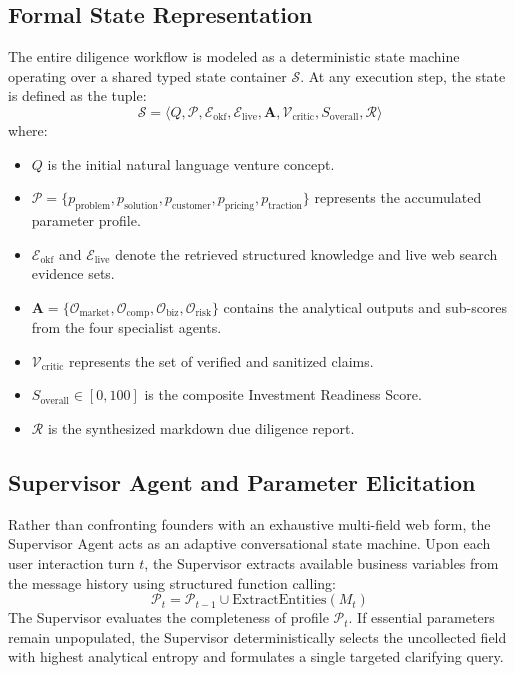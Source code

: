 \documentclass[conference]{IEEEtran}
\begin{document}
\subsection{Formal State Representation}
The entire diligence workflow is modeled as a deterministic state machine operating over a shared typed state container $\mathcal{S}$. At any execution step, the state is defined as the tuple:
\begin{equation}
\mathcal{S} = \langle Q, \mathcal{P}, \mathcal{E}_{\text{okf}}, \mathcal{E}_{\text{live}}, \mathbf{A}, \mathcal{V}_{\text{critic}}, S_{\text{overall}}, \mathcal{R} \rangle
\end{equation}
where:
\begin{itemize}
    \item $Q$ is the initial natural language venture concept.
    \item $\mathcal{P} = \{p_{\text{problem}}, p_{\text{solution}}, p_{\text{customer}}, p_{\text{pricing}}, p_{\text{traction}}\}$ represents the accumulated parameter profile.
    \item $\mathcal{E}_{\text{okf}}$ and $\mathcal{E}_{\text{live}}$ denote the retrieved structured knowledge and live web search evidence sets.
    \item $\mathbf{A} = \{\mathcal{O}_{\text{market}}, \mathcal{O}_{\text{comp}}, \mathcal{O}_{\text{biz}}, \mathcal{O}_{\text{risk}}\}$ contains the analytical outputs and sub-scores from the four specialist agents.
    \item $\mathcal{V}_{\text{critic}}$ represents the set of verified and sanitized claims.
    \item $S_{\text{overall}} \in [0, 100]$ is the composite Investment Readiness Score.
    \item $\mathcal{R}$ is the synthesized markdown due diligence report.
\end{itemize}

\subsection{Supervisor Agent and Parameter Elicitation}
Rather than confronting founders with an exhaustive multi-field web form, the Supervisor Agent acts as an adaptive conversational state machine. Upon each user interaction turn $t$, the Supervisor extracts available business variables from the message history using structured function calling:
\begin{equation}
\mathcal{P}_t = \mathcal{P}_{t-1} \cup \text{ExtractEntities}(M_t)
\end{equation}
The Supervisor evaluates the completeness of profile $\mathcal{P}_t$. If essential parameters remain unpopulated, the Supervisor deterministically selects the uncollected field with highest analytical entropy and formulates a single targeted clarifying query. 
\end{document}
